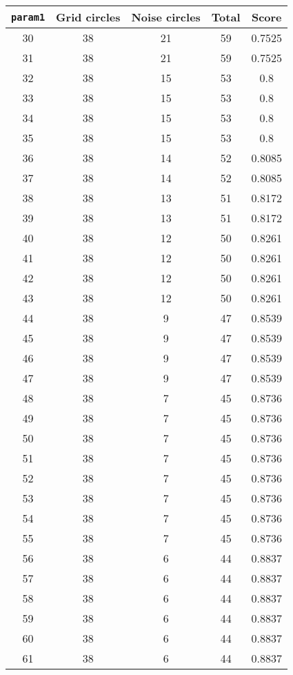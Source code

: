 \documentclass[letterpaper, 12pt]{article}
\begin{document}
\begin{longtable}{|c|c|c|c|c|}
\hline
\textbf{\texttt{param1}} & \textbf{Grid circles} & \textbf{Noise circles} & \textbf{Total} & \textbf{Score} \\
\hline
30 & 38 & 21 & 59 & 0.7525 \\
\hline
31 & 38 & 21 & 59 & 0.7525 \\
\hline
32 & 38 & 15 & 53 & 0.8 \\
\hline
33 & 38 & 15 & 53 & 0.8 \\
\hline
34 & 38 & 15 & 53 & 0.8 \\
\hline
35 & 38 & 15 & 53 & 0.8 \\
\hline
36 & 38 & 14 & 52 & 0.8085 \\
\hline
37 & 38 & 14 & 52 & 0.8085 \\
\hline
38 & 38 & 13 & 51 & 0.8172 \\
\hline
39 & 38 & 13 & 51 & 0.8172 \\
\hline
40 & 38 & 12 & 50 & 0.8261 \\
\hline
41 & 38 & 12 & 50 & 0.8261 \\
\hline
42 & 38 & 12 & 50 & 0.8261 \\
\hline
43 & 38 & 12 & 50 & 0.8261 \\
\hline
44 & 38 & 9 & 47 & 0.8539 \\
\hline
45 & 38 & 9 & 47 & 0.8539 \\
\hline
46 & 38 & 9 & 47 & 0.8539 \\
\hline
47 & 38 & 9 & 47 & 0.8539 \\
\hline
48 & 38 & 7 & 45 & 0.8736 \\
\hline
49 & 38 & 7 & 45 & 0.8736 \\
\hline
50 & 38 & 7 & 45 & 0.8736 \\
\hline
51 & 38 & 7 & 45 & 0.8736 \\
\hline
52 & 38 & 7 & 45 & 0.8736 \\
\hline
53 & 38 & 7 & 45 & 0.8736 \\
\hline
54 & 38 & 7 & 45 & 0.8736 \\
\hline
55 & 38 & 7 & 45 & 0.8736 \\
\hline
56 & 38 & 6 & 44 & 0.8837 \\
\hline
57 & 38 & 6 & 44 & 0.8837 \\
\hline
58 & 38 & 6 & 44 & 0.8837 \\
\hline
59 & 38 & 6 & 44 & 0.8837 \\
\hline
60 & 38 & 6 & 44 & 0.8837 \\
\hline
61 & 38 & 6 & 44 & 0.8837 \\

\end{longtable}
\end{document}
